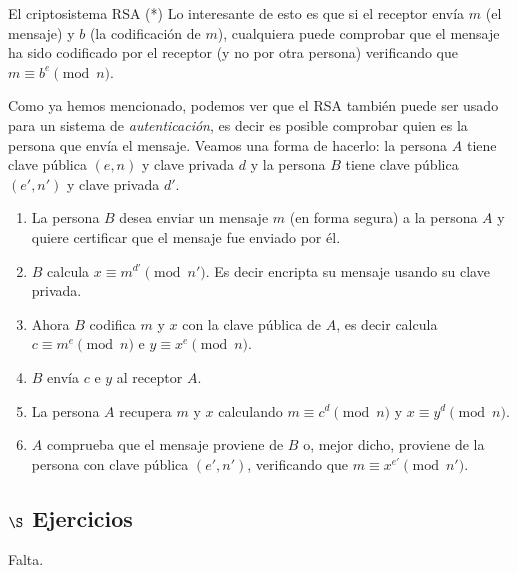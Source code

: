\begin{section}{El criptosistema RSA (*)}
Lo interesante de esto es que si el receptor envía $m$ (el mensaje) y $b$ (la codificación de $m$), cualquiera puede comprobar que el mensaje ha sido codificado por el receptor (y no por otra persona) verificando  que   $m \equiv b^e \pmod{n}$.     


\begin{ejemplo*}
Como ya hemos mencionado, podemos ver que el RSA también puede ser usado para un sistema de \emph{autenticación}, es decir es posible comprobar quien es la persona que envía el mensaje. Veamos una forma de hacerlo: la persona $A$ tiene clave pública $(e,n)$ y clave privada $d$ y   la persona $B$  tiene clave pública $(e',n')$ y clave privada $d'$. 

\begin{enumerate}[label=\textit{\alph*)}]
    \item  La persona $B$ desea enviar un mensaje $m$ (en forma segura) a la persona $A$ y quiere certificar que el mensaje fue enviado por él.
    \item  $B$ calcula $x \equiv m^{d'} \pmod{n'}$. Es decir encripta su mensaje usando su  clave privada.
    \item  Ahora $B$ codifica $m$ y $x$ con la clave pública de $A$, es decir calcula $c \equiv m^{e} \pmod{n}$ e  $y \equiv x^e \pmod{n}$. 
    \item  $B$ envía $c$ e $y$ al receptor $A$.
    \item  La persona $A$ recupera $m$ y $x$ calculando  $m \equiv c^d \pmod{n}$ y  $x \equiv y^d \pmod{n}$.
    \item  $A$ comprueba que el mensaje  proviene de $B$ o, mejor dicho, proviene de la persona con clave pública $(e',n')$, verificando que $m \equiv x^{e'} \pmod{n'}$. 
\end{enumerate}
\end{ejemplo*}

\subsection*{$\S$ Ejercicios}

\begin{enumex}
    \item Falta.
\end{enumex}
\end{section}
